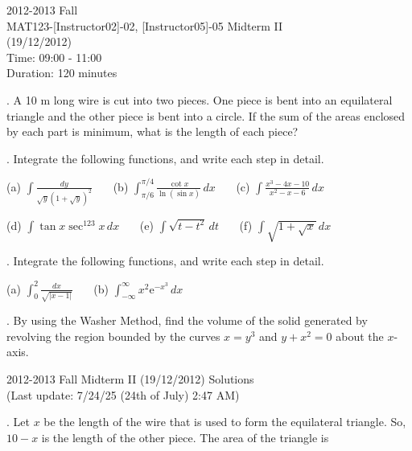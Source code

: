 \documentclass{article}
\begin{document}
\pagestyle{empty}
\large

\begin{center}
2012-2013 Fall \\MAT123-[Instructor02]-02, [Instructor05]-05 Midterm II\\(19/12/2012)\\Time: 09:00 - 11:00\\Duration: 120 minutes
\end{center}

. A 10 m long wire is cut into two pieces. One piece is bent into an equilateral triangle and the other piece is bent into a circle. If the sum of the areas enclosed by each part is minimum, what is the length of each piece?

\hfill

. Integrate the following functions, and write each step in detail.

\hfill

(a) $\displaystyle\int\frac{dy}{\sqrt{y}\left(1+\sqrt y\right)^2}$ \ \ \ (b) $\displaystyle\int_{\pi/6}^{\pi/4}\frac{\cot x}{\ln(\sin x)}\,dx$ \ \ \ (c) $\displaystyle\int\frac{x^3-4x-10}{x^2-x-6}\,dx$

\hfill

(d) $\displaystyle \int\tan x \sec^{123}x\,dx$ \ \ \ (e) $\displaystyle\int\sqrt{t-t^2}\,dt$ \ \ \ (f) $\displaystyle\int\sqrt{1+\sqrt x}\,dx$

\hfill

. Integrate the following functions, and write each step in detail.

\hfill

(a) $\displaystyle \int_0^2\frac{dx}{\sqrt{|x-1|}}$ \ \ \ (b) $\displaystyle\int_{-\infty}^{\infty}x^2\mathrm{e}^{-x^3}\,dx$

\hfill

. By using the Washer Method, find the volume of the solid generated by revolving the region bounded by the curves $x=y^3$ and $y+x^2=0$ about the $x$-axis.

\newpage

\begin{center}
2012-2013 Fall Midterm II (19/12/2012) Solutions\\
(Last update: 7/24/25 (24th of July) 2:47 AM)
\end{center}

. Let $x$ be the length of the wire that is used to form the equilateral triangle. So, $10-x$ is the length of the other piece. The area of the triangle is
\end{document}
